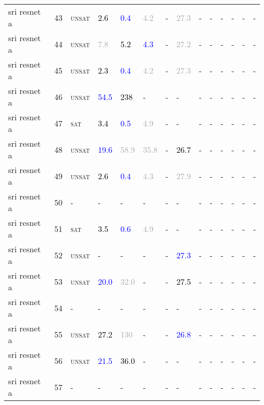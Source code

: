 \begin{center}
{\begin{longtable}{@{}llllllllllllll@{}}
sri resnet a & 43 & \textsc{unsat} & \textcolor{black}{2.6} & \textcolor{blue}{0.4} & \textcolor{darkgray}{4.2} & - & \textcolor{darkgray}{27.3} & - & - & - & - & - & - \\
sri resnet a & 44 & \textsc{unsat} & \textcolor{darkgray}{7.8} & \textcolor{black}{5.2} & \textcolor{blue}{4.3} & - & \textcolor{darkgray}{27.2} & - & - & - & - & - & - \\
sri resnet a & 45 & \textsc{unsat} & \textcolor{black}{2.3} & \textcolor{blue}{0.4} & \textcolor{darkgray}{4.2} & - & \textcolor{darkgray}{27.3} & - & - & - & - & - & - \\
sri resnet a & 46 & \textsc{unsat} & \textcolor{blue}{54.5} & \textcolor{black}{238} & - & - & - & - & - & - & - & - & - \\
sri resnet a & 47 & \textsc{sat} & \textcolor{black}{3.4} & \textcolor{blue}{0.5} & \textcolor{darkgray}{4.9} & - & - & - & - & - & - & - & - \\
sri resnet a & 48 & \textsc{unsat} & \textcolor{blue}{19.6} & \textcolor{darkgray}{58.9} & \textcolor{darkgray}{35.8} & - & \textcolor{black}{26.7} & - & - & - & - & - & - \\
sri resnet a & 49 & \textsc{unsat} & \textcolor{black}{2.6} & \textcolor{blue}{0.4} & \textcolor{darkgray}{4.3} & - & \textcolor{darkgray}{27.9} & - & - & - & - & - & - \\
sri resnet a & 50 & - & - & - & - & - & - & - & - & - & - & - & - \\
sri resnet a & 51 & \textsc{sat} & \textcolor{black}{3.5} & \textcolor{blue}{0.6} & \textcolor{darkgray}{4.9} & - & - & - & - & - & - & - & - \\
sri resnet a & 52 & \textsc{unsat} & - & - & - & - & \textcolor{blue}{27.3} & - & - & - & - & - & - \\
sri resnet a & 53 & \textsc{unsat} & \textcolor{blue}{20.0} & \textcolor{darkgray}{32.0} & - & - & \textcolor{black}{27.5} & - & - & - & - & - & - \\
sri resnet a & 54 & - & - & - & - & - & - & - & - & - & - & - & - \\
sri resnet a & 55 & \textsc{unsat} & \textcolor{black}{27.2} & \textcolor{darkgray}{130} & - & - & \textcolor{blue}{26.8} & - & - & - & - & - & - \\
sri resnet a & 56 & \textsc{unsat} & \textcolor{blue}{21.5} & \textcolor{black}{36.0} & - & - & - & - & - & - & - & - & - \\
sri resnet a & 57 & - & - & - & - & - & - & - & - & - & - & - & - \\

\end{longtable}}
\end{center}
